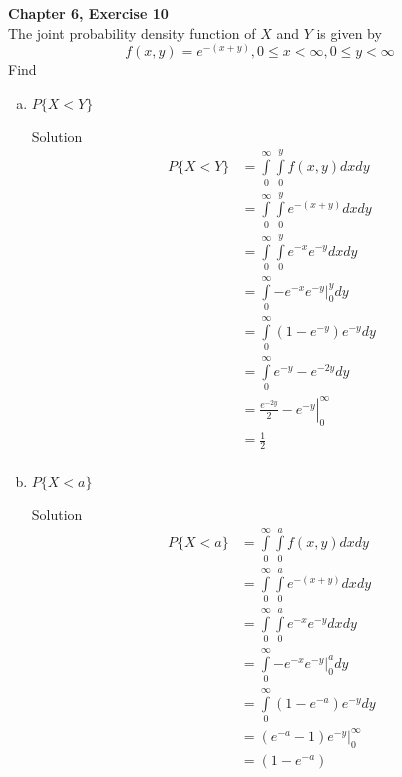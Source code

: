 \documentclass{article}
\begin{document}
\begin{spacing}{1.1}
\newpage
\begin{homeworkProblem}
  {\bf Chapter 6, Exercise 10}\\
  The joint probability density function of $X$ and $Y$ is given by
    \[f( x, y) = e^{-(x + y)}, 0 \le x < \infty, 0 \le y < \infty\]
  Find 
  \begin{enumerate}[(a)]
    \item $P\{ X < Y\}$
      \begin{homeworkSection}{Solution}
        \begin{align*}
          P\{ X < Y\} 
          &= \int\limits_0^\infty \int\limits_0^y f( x, y) dx dy\\
          &= \int\limits_0^\infty \int\limits_0^y e^{-(x + y)} dx dy\\
          &= \int\limits_0^\infty \int\limits_0^y e^{-x} e^{-y} dx dy\\
          &= \int\limits_0^\infty \left. -e^{-x} e^{-y}\right|_0^y dy\\
          &= \int\limits_0^\infty (1 - e^{-y}) e^{-y} dy\\
          &= \int\limits_0^\infty e^{-y} - e^{-2y} dy\\
          &= \left.\frac{ e^{-2y}}{ 2} - e^{-y}\right|_0^\infty\\
          &= \frac{ 1}{ 2}\\
        \end{align*}
      \end{homeworkSection}
    \item $P\{ X < a\}$
      \begin{homeworkSection}{Solution}
        \begin{align*}
          P\{ X < a\} 
          &= \int\limits_0^\infty \int\limits_0^a f( x, y) dx dy\\
          &= \int\limits_0^\infty \int\limits_0^a e^{-(x + y)} dx dy\\
          &= \int\limits_0^\infty \int\limits_0^a e^{-x} e^{-y} dx dy\\
          &= \int\limits_0^\infty \left. -e^{-x} e^{-y}\right|_0^a dy\\
          &= \int\limits_0^\infty (1 - e^{-a}) e^{-y} dy\\
          &= \left. (e^{-a} - 1) e^{-y} \right|_0^\infty\\
          &= (1 - e^{-a})\\
        \end{align*}
      \end{homeworkSection}
  \end{enumerate}
\end{homeworkProblem}


\end{spacing}
\end{document}
